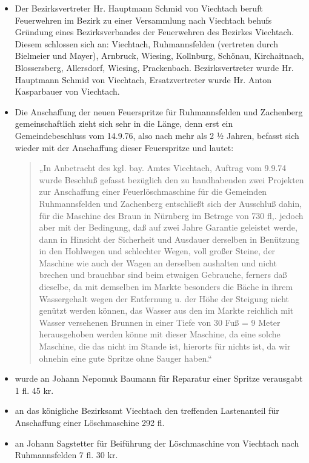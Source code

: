 \documentclass[12pt,a4paper]{book}
\begin{document}
\begin{itemize}
\item Der Bezirksvertreter Hr. Hauptmann Schmid von Viechtach beruft Feuerwehren
im Bezirk zu einer Versammlung nach Viechtach behufs Gründung eines
Bezirksverbandes der Feuerwehren des Bezirkes Viechtach. Diesem schlossen sich
an: Viechtach, Ruhmannsfelden (vertreten durch Bielmeier und Mayer), Arnbruck,
Wiesing, Kollnburg, Schönau, Kirchaitnach, Blossersberg, Allersdorf, Wiesing,
Prackenbach. Bezirksvertreter wurde Hr. Hauptmann Schmid von Viechtach,
Ersatzvertreter wurde Hr. Anton Kasparbauer von Viechtach.

\item Die Anschaffung der neuen Feuerspritze für Ruhmannsfelden und Zachenberg
gemeinschaftlich zieht sich sehr in die Länge, denn erst ein Gemeindebeschluss
vom 14.9.76, also nach mehr als 2 ½ Jahren, befasst sich wieder mit der
Anschaffung dieser Feuerspritze und lautet:

\begin{quote}
„In Anbetracht des kgl. bay. Amtes Viechtach, Auftrag vom 9.9.74 wurde Beschluß
gefasst bezüglich den zu handhabenden zwei Projekten zur Anschaffung einer
Feuerlöschmaschine für die Gemeinden Ruhmannsfelden und Zachenberg entschließt
sich der Ausschluß dahin, für die Maschine des Braun in Nürnberg im Betrage von
730 fl,. jedoch aber mit der Bedingung, daß auf zwei Jahre Garantie geleistet
werde, dann in Hinsicht der Sicherheit und Ausdauer derselben in Benützung in
den Hohlwegen und schlechter Wegen, voll großer Steine, der Maschine wie auch
der Wagen an derselben aushalten und nicht brechen und brauchbar sind beim
etwaigen Gebrauche, ferners daß dieselbe, da mit demselben im Markte besonders
die Bäche in ihrem Wassergehalt wegen der Entfernung u. der Höhe der Steigung
nicht genützt werden können, das Wasser aus den im Markte reichlich mit Wasser
versehenen Brunnen in einer Tiefe von 30 Fuß = 9 Meter herausgehoben werden
könne mit dieser Maschine, da eine solche Maschine, die das nicht im Stande ist,
hierorts für nichts ist, da wir ohnehin eine gute Spritze ohne Sauger haben.“
\end{quote}

\item wurde an Johann Nepomuk Baumann für Reparatur einer Spritze verausgabt 1
fl. 45 kr.

\item an das königliche Bezirksamt Viechtach den treffenden Lastenanteil für
Anschaffung einer Löschmaschine 292 fl.

\item an Johann Sagstetter für Beiführung der Löschmaschine von Viechtach nach
Ruhmannsfelden 7 fl. 30 kr.
\end{itemize}
\end{document}
